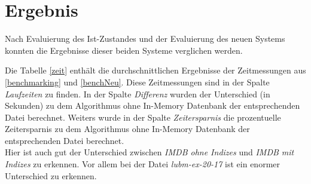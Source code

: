 \documentclass[draft,final]{vutinfth} %
\begin{document}
\chapter{Ergebnis}
Nach Evaluierung des Ist-Zustandes und der Evaluierung des neuen Systems konnten die Ergebnisse dieser beiden Systeme verglichen werden.

Die Tabelle \ref{zeit} enthält die durchschnittlichen Ergebnisse der Zeitmessungen aus \ref{benchmarking} und \ref{benchNeu}. Diese Zeitmessungen sind in der Spalte \textit{Laufzeiten} zu finden. In der Spalte \textit{Differenz} wurden der Unterschied (in Sekunden) zu dem Algorithmus ohne In-Memory Datenbank der entsprechenden Datei berechnet. Weiters wurde in der Spalte \textit{Zeitersparnis} die prozentuelle Zeitersparnis zu dem Algorithmus ohne In-Memory Datenbank der entsprechenden Datei berechnet. \\
Hier ist auch gut der Unterschied zwischen \textit{IMDB ohne Indizes} und \textit{IMDB mit Indizes} zu erkennen. Vor allem bei der Datei \textit{lubm-ex-20-17} ist ein enormer Unterschied zu erkennen.
\end{document}
